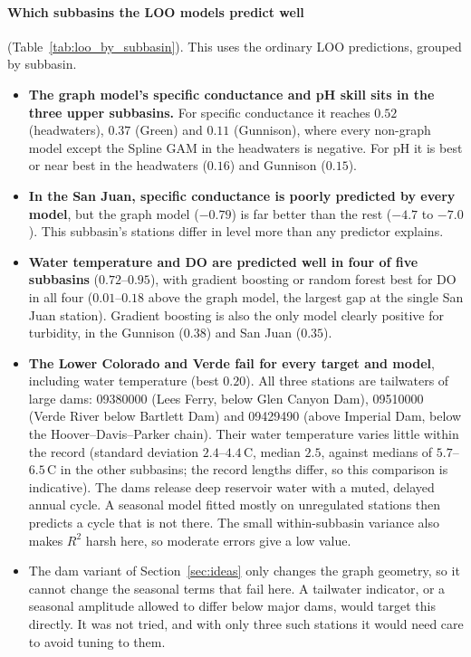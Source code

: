 \documentclass[11pt]{article}
\begin{document}
\paragraph{Which subbasins the LOO models predict well} (Table~\ref{tab:loo_by_subbasin}). This
uses the ordinary LOO predictions, grouped by subbasin.
\begin{itemize}
  \item \textbf{The graph model's specific conductance and pH skill sits in the three upper
        subbasins.} For specific conductance it reaches $0.52$ (headwaters), $0.37$ (Green) and
        $0.11$ (Gunnison), where every non-graph model except the Spline GAM in the headwaters is
        negative. For pH it is best or near best in the headwaters ($0.16$) and Gunnison ($0.15$).
  \item \textbf{In the San Juan, specific conductance is poorly predicted by every model}, but the
        graph model ($-0.79$) is far better than the rest ($-4.7$ to $-7.0$). This subbasin's
        stations differ in level more than any predictor explains.
  \item \textbf{Water temperature and DO are predicted well in four of five subbasins} ($0.72$--$0.95$),
        with gradient boosting or random forest best for DO in all four ($0.01$--$0.18$ above the
        graph model, the largest gap at the single San Juan station). Gradient boosting is also the only
        model clearly positive for turbidity, in the Gunnison ($0.38$) and San Juan ($0.35$).
  \item \textbf{The Lower Colorado and Verde fail for every target and model}, including water
        temperature (best $0.20$). All three stations are tailwaters of large dams: 09380000 (Lees
        Ferry, below Glen Canyon Dam), 09510000 (Verde River below Bartlett Dam) and 09429490 (above
        Imperial Dam, below the Hoover--Davis--Parker chain). Their water temperature varies little
        within the record (standard deviation $2.4$--$4.4$\,\textdegree C, median $2.5$, against
        medians of $5.7$--$6.5$\,\textdegree C in the other subbasins; the record lengths differ, so this
        comparison is indicative). The dams release deep reservoir water with a muted, delayed annual
        cycle. A seasonal model fitted mostly on unregulated stations then predicts a cycle that is
        not there. The small within-subbasin variance also makes $R^2$ harsh here, so moderate
        errors give a low value.
  \item The dam variant of Section~\ref{sec:ideas} only changes the graph geometry, so it cannot
        change the seasonal terms that fail here. A tailwater indicator, or a seasonal amplitude
        allowed to differ below major dams, would target this directly. It was not tried, and with
        only three such stations it would need care to avoid tuning to them.
\end{itemize}
\end{document}
